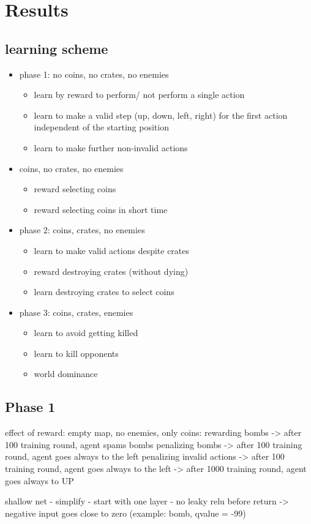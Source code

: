 \section{Results}

\subsection{learning scheme}

\begin{itemize}
	\item phase 1: no coins, no crates, no enemies
		\begin{itemize}
			\item learn by reward to perform/ not perform a single action 
			\item learn to make a valid step (up, down, left, right) for the first action independent of the starting position
			\item learn to make further non-invalid actions 
		\end{itemize}
	\item coins, no crates, no enemies
		\begin{itemize}
			\item reward selecting coins
			\item reward selecting coins in short time
		\end{itemize}
	\item phase 2: coins, crates, no enemies
		\begin{itemize}
			\item learn to make valid actions despite crates
			\item reward destroying crates (without dying)
			\item learn destroying crates to select coins
		\end{itemize}
	\item phase 3: coins, crates, enemies
		\begin{itemize}
			\item learn to avoid getting killed
			\item learn to kill opponents
			\item world dominance
		\end{itemize}
\end{itemize}



\subsection{Phase 1}

effect of reward:
empty map, no enemies, only coins:
rewarding bombs -> after 100 training round, agent spams bombs 
penalizing bombs -> after 100 training round, agent goes always to the left 
penalizing invalid actions -> after 100 training round, agent goes always to the left 
-> after 1000 training round, agent goes always to UP



shallow net
- simplify
- start with one layer
- no leaky relu before return -> negative input goes close to zero (example: bomb, qvalue = -99)